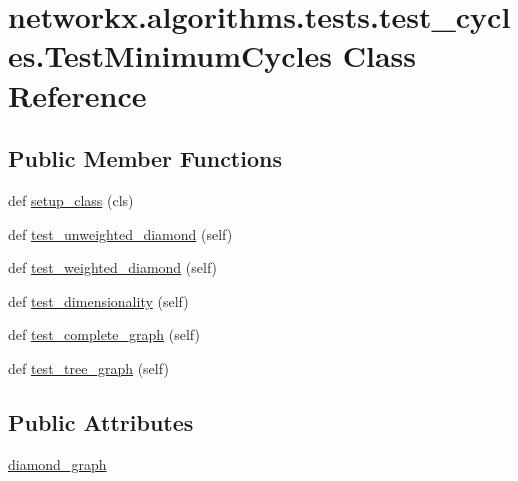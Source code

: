 \hypertarget{classnetworkx_1_1algorithms_1_1tests_1_1test__cycles_1_1TestMinimumCycles}{}\section{networkx.\+algorithms.\+tests.\+test\+\_\+cycles.\+Test\+Minimum\+Cycles Class Reference}
\label{classnetworkx_1_1algorithms_1_1tests_1_1test__cycles_1_1TestMinimumCycles}
\subsection*{Public Member Functions}
\begin{DoxyCompactItemize}
\item 
def \hyperlink{classnetworkx_1_1algorithms_1_1tests_1_1test__cycles_1_1TestMinimumCycles_a66c9b3adbc2d667d03952a960e479b34}{setup\+\_\+class} (cls)
\item 
def \hyperlink{classnetworkx_1_1algorithms_1_1tests_1_1test__cycles_1_1TestMinimumCycles_aea165546608314169089eda6275e20b0}{test\+\_\+unweighted\+\_\+diamond} (self)
\item 
def \hyperlink{classnetworkx_1_1algorithms_1_1tests_1_1test__cycles_1_1TestMinimumCycles_a8d02cbadb5aaa6af61e65b3445fb26f5}{test\+\_\+weighted\+\_\+diamond} (self)
\item 
def \hyperlink{classnetworkx_1_1algorithms_1_1tests_1_1test__cycles_1_1TestMinimumCycles_ae4c85a1d3618f98e6d7ad35d47553db2}{test\+\_\+dimensionality} (self)
\item 
def \hyperlink{classnetworkx_1_1algorithms_1_1tests_1_1test__cycles_1_1TestMinimumCycles_aee33f6b468c69aa1d7e756b73edda8a3}{test\+\_\+complete\+\_\+graph} (self)
\item 
def \hyperlink{classnetworkx_1_1algorithms_1_1tests_1_1test__cycles_1_1TestMinimumCycles_aeb0e3956f52cd32af4f8b8c28c024fba}{test\+\_\+tree\+\_\+graph} (self)
\end{DoxyCompactItemize}
\subsection*{Public Attributes}
\begin{DoxyCompactItemize}
\item 
\hyperlink{classnetworkx_1_1algorithms_1_1tests_1_1test__cycles_1_1TestMinimumCycles_a734c5ea0491b1d7e01435d13ce8b1b4b}{diamond\+\_\+graph}
\end{DoxyCompactItemize}


